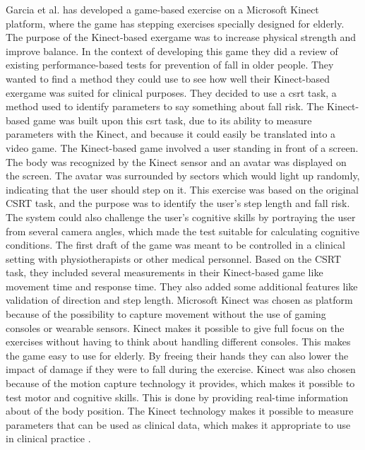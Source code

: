 Garcia et al. \cite{garcia2012exergames} has developed a game-based exercise on a Microsoft Kinect platform, where the game has stepping exercises specially designed for elderly. The purpose of the Kinect-based exergame was to increase physical strength and improve balance. In the context of developing this game they did a review of existing performance-based tests for prevention of fall in older people. They wanted to find a method they could use to see how well their Kinect-based exergame was suited for clinical purposes. They decided to use a \ac{csrt} task, a method used to identify parameters to say something about fall risk.  The Kinect-based game was built upon this \ac{csrt} task, due to its ability to measure parameters with the Kinect, and because it could easily be translated into a video game. The Kinect-based game involved a user standing in front of a screen. The body was recognized by the Kinect sensor and an avatar was displayed on the screen.  The avatar was surrounded by sectors which would light up randomly, indicating that the user should step on it. This exercise was based on the original CSRT task, and the purpose was to identify the user’s step length and fall risk. The system could also challenge the user’s cognitive skills by portraying the user from several camera angles, which made the test suitable for calculating cognitive conditions.  The first draft of the game was meant to be controlled in a clinical setting with physiotherapists or other medical personnel. Based on the CSRT task, they included several measurements in their Kinect-based game like movement time and response time. They also added some additional features like validation of direction and step length.  Microsoft Kinect was chosen as platform because of the possibility to capture movement without the use of gaming consoles or wearable sensors. Kinect makes it possible to give full focus on the exercises without having to think about handling different consoles. This makes the game easy to use for elderly. By freeing their hands they can also lower the impact of damage if they were to fall during the exercise.  Kinect was also chosen because of the motion capture technology it provides, which makes it possible to test motor and cognitive skills. This is done by providing real-time information about of the body position. The Kinect technology makes it possible to measure parameters that can be used as clinical data, which makes it appropriate to use in clinical practice \cite{garcia2012exergames}.\\ \\
